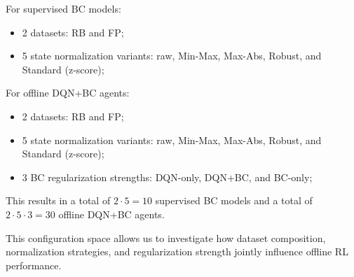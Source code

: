 For supervised BC models:

\begin{itemize}
    \item 2 datasets: RB and FP;
    \item 5 state normalization variants: raw, Min-Max, Max-Abs, Robust, and Standard (z-score);
\end{itemize}

For offline DQN+BC agents:
\begin{itemize}
    \item 2 datasets: RB and FP;
    \item 5 state normalization variants: raw, Min-Max, Max-Abs, Robust, and Standard (z-score);
    \item 3 BC regularization strengths: DQN-only, DQN+BC, and BC-only;
\end{itemize}
This results in a total of $2 \cdot 5=10$ supervised BC models and a total of $2 \cdot 5 \cdot 3 = 30$ offline DQN+BC agents.


This configuration space allows us to investigate how dataset composition, normalization strategies, and regularization strength jointly influence offline RL performance.
